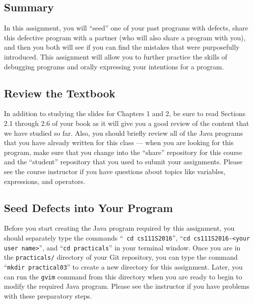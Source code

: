 


\subsection*{Summary}

In this assignment, you will ``seed'' one of your past programs with defects, share this defective program with a
partner (who will also share a program with you), and then you both will see if you can find the mistakes that were
purposefully introduced. This assignment will allow you to further practice the skills of debugging programs and orally
expressing your intentions for a program.

\vspace*{-.1in}
\subsection*{Review the Textbook}

In addition to studying the slides for Chapters 1 and 2, be sure to read Sections 2.1 through 2.6 of your book as it
will give you a good review of the content that we have studied so far. Also, you should briefly review all of the Java
programs that you have already written for this class --- when you are looking for this program, make sure that you
change into the ``share'' repository for this course and the ``student'' repository that you used to submit your
assignments. Please see the course instructor if you have questions about topics like variables, expressions, and
operators.

\vspace*{-.1in}
\subsection*{Seed Defects into Your Program}

Before you start creating the Java program required by this assignment, you should separately type the commands ``{\tt
cd cs111S2016}'', ``{\tt cd cs111S2016-<your user name>}'', and ``{\tt cd practicals}'' in your terminal window. Once
you are in the {\tt practicals/} directory of your Git repository, you can type the command ``{\tt mkdir practical03}''
to create a new directory for this assignment. Later, you can run the {\tt gvim} command from this directory when you
are ready to begin to modify the required Java program. Please see the instructor if you have problems with these
preparatory steps.

